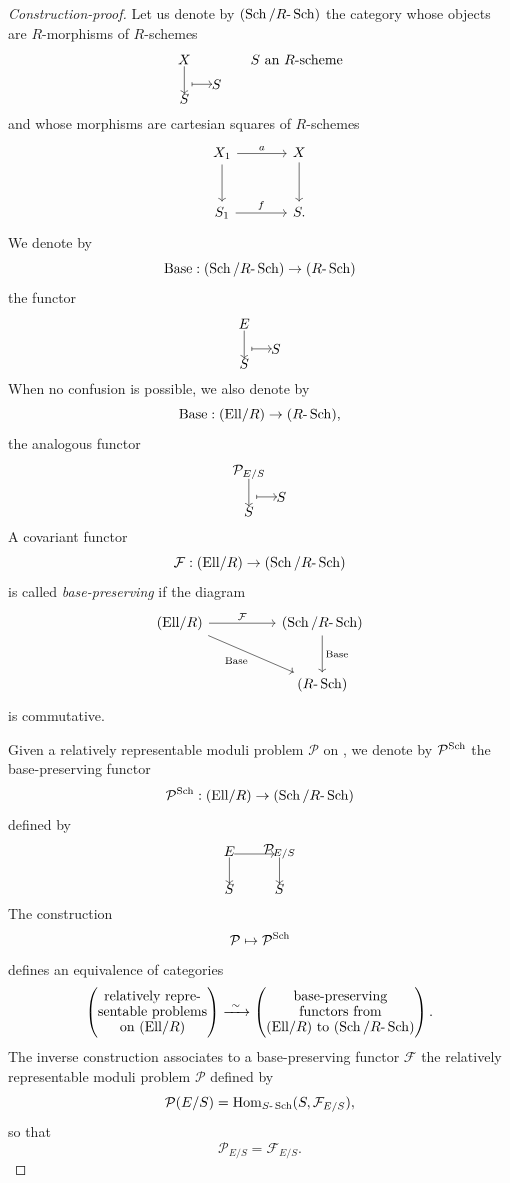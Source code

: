 \begin{proof}[Construction-proof]
Let us denote by $(\operatorname{Sch}/R\text{-}\operatorname{Sch})$ the category whose objects are $R$-morphisms of $R$-schemes
\[
\kmobj{X}{S} \qquad S \text{ an } R\text{-scheme}
\]
and whose morphisms are cartesian squares of $R$-schemes
\[
\begin{tikzcd}[column sep=large, row sep=large]
X_1 \arrow[r, "a"] \arrow[d] & X \arrow[d] \\
S_1 \arrow[r, "f"] & S .
\end{tikzcd}
\]
We denote by
\[
\mathrm{Base} : (\operatorname{Sch}/R\text{-}\operatorname{Sch}) \to (R\text{-}\operatorname{Sch})
\]
the functor
\[
\kmobj{E}{S}
\]
When no confusion is possible, we also denote by
\[
\mathrm{Base} : (\mathrm{Ell}/R) \to (R\text{-}\operatorname{Sch}) ,
\]
the analogous functor
\[
\kmobj{\mathcal{P}_{E/S}}{S}
\]
A covariant functor
\[
\mathcal{F} : (\mathrm{Ell}/R) \to (\operatorname{Sch}/R\text{-}\operatorname{Sch})
\]
is called \emph{base-preserving} if the diagram
\[
\begin{tikzcd}[column sep=huge, row sep=large]
\EllR \arrow[r, "\mathcal{F}"] \arrow[rd, "\mathrm{Base}"'] & (\Sch/R\text{-}\Sch) \arrow[d, "\mathrm{Base}"] \\
& (R\text{-}\Sch)
\end{tikzcd}
\]
is commutative.

Given a relatively representable moduli problem $\mathcal{P}$ on \EllR, we denote by $\mathcal{P}^{\operatorname{Sch}}$ the base-preserving functor
\[
\mathcal{P}^{\operatorname{Sch}} : (\mathrm{Ell}/R) \to (\operatorname{Sch}/R\text{-}\operatorname{Sch})
\]
defined by
\[
\kmfobj{E}{\mathcal{P}_{E/S}}{S}
\]
The construction
\[
\mathcal{P} \mapsto \mathcal{P}^{\operatorname{Sch}}
\]
defines an equivalence of categories
\[
\left(\begin{array}{@{}c@{}}
\text{relatively repre-} \\[-1pt]
\text{sentable problems} \\[-1pt]
\text{on \EllR}
\end{array}\right) \xrightarrow{\ \sim\ }
\left(\begin{array}{@{}c@{}}
\text{base-preserving} \\[-1pt]
\text{functors from} \\[-1pt]
\text{\EllR\ to $(\Sch/R\text{-}\Sch)$}
\end{array}\right) .
\]
The inverse construction associates to a base-preserving functor $\mathcal{F}$ the relatively representable moduli problem $\mathcal{P}$ defined by
\[
\mathcal{P}(E/S) = \operatorname{Hom}_{S\text{-}\operatorname{Sch}}(S, \mathcal{F}_{E/S}) ,
\]
so that
\[
\mathcal{P}_{E/S} = \mathcal{F}_{E/S} .
\]


\end{proof}
